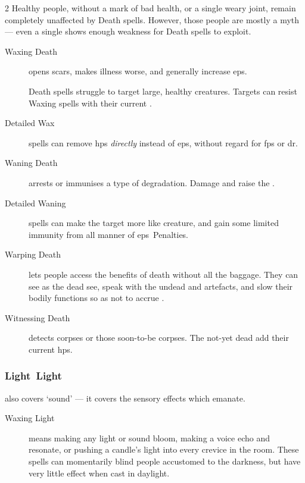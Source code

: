 \begin{multicols}{2}
  Healthy people, without a mark of bad health, or a single weary joint, remain completely unaffected by Death \glspl{spell}.
  However, those people are mostly a myth --- even a single  shows enough weakness for Death \glspl{spell} to exploit.

\begin{description}
  \item[Waxing Death]
  opens scars, makes illness worse, and generally increase \glspl{ep}.

  Death \glspl{spell} struggle to target large, healthy creatures.
  Targets can resist Waxing \glspl{spell} with their current .

  \item[Detailed Wax] \glspl{spell} can remove \glspl{hp} \emph{directly} instead of \glspl{ep}, without regard for \glspl{fp} or \gls{dr}.

  \item[Waning Death]
  arrests or immunises a type of degradation.
  Damage and  raise the .

  \item[Detailed Waning]
  \glspl{spell} can make the target more like  creature, and gain some limited immunity from all manner of \glspl{ep}~Penalties.

  \item[Warping Death]
  lets people access the benefits of death without all the baggage.
  They can see as the dead see, speak with the undead and \glspl{artefact}, and slow their bodily functions so as not to accrue .

  \item[Witnessing Death]
  detects corpses or those soon-to-be corpses.
  The not-yet dead add their current \glspl{hp}.
\end{description}

\subsubsection[Light]{\gls{Light}~Light}
also covers `sound' --- it covers the sensory effects which emanate.

\begin{description}
  \item[Waxing Light]
  means making any light or sound bloom, making a voice echo and resonate, or pushing a candle's light into every crevice in the room.
  These \glspl{spell} can momentarily blind people accustomed to the darkness, but have very little effect when cast in daylight.


\end{description}
\end{multicols}

